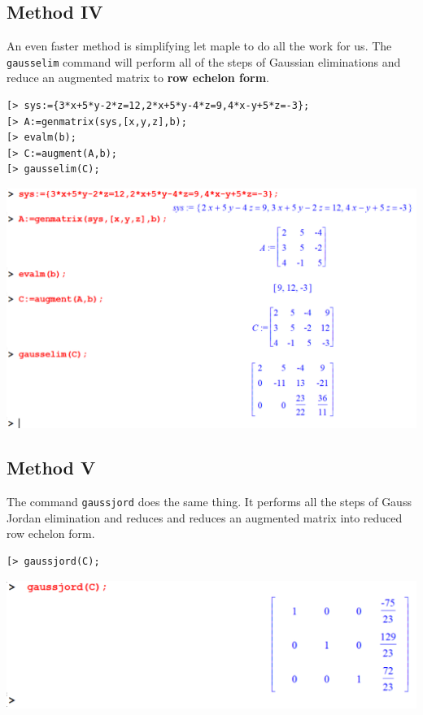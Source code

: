 \documentclass[
]{book}
\theoremstyle{definition}
\theoremstyle{definition}
\theoremstyle{definition}
\theoremstyle{definition}
\theoremstyle{remark}
\begin{document}
\subsection{Method IV}\label{method-iv}

An even faster method is simplifying let maple to do all the work for us. The \texttt{gausselim} command will perform all of the steps of Gaussian eliminations and reduce an augmented matrix to \textbf{row echelon form}.

\begin{verbatim}
[> sys:={3*x+5*y-2*z=12,2*x+5*y-4*z=9,4*x-y+5*z=-3};
[> A:=genmatrix(sys,[x,y,z],b);
[> evalm(b);
[> C:=augment(A,b);
[> gausselim(C);
\end{verbatim}

\includegraphics{figures/Lesson 5/fig15.png}

\subsection{Method V}\label{method-v}

The command \texttt{gaussjord} does the same thing.
It performs all the steps of Gauss Jordan elimination and reduces and reduces an augmented matrix into reduced row echelon form.

\begin{verbatim}
[> gaussjord(C);
\end{verbatim}

\includegraphics{figures/Lesson 5/fig16.png}
\end{document}
